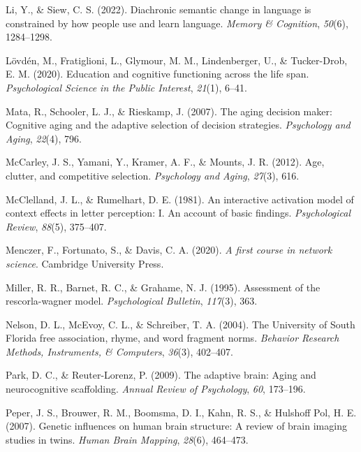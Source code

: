 \documentclass[
  man,floatsintext]{apa6}
\newlength{\cslhangindent}
\newlength{\cslentryspacingunit} %
\newenvironment{CSLReferences}[2] %
 {%
  \setlength{\parindent}{0pt}
  \ifodd #1
  \let\oldpar\par
  \def\par{\hangindent=\cslhangindent\oldpar}
  \fi
  \setlength{\parskip}{#2\cslentryspacingunit}
 }%
 {}
\begin{document}
\begin{CSLReferences}{1}{0}
\leavevmode{}%
Li, Y., \& Siew, C. S. (2022). Diachronic semantic change in language is constrained by how people use and learn language. \emph{Memory \& Cognition}, \emph{50}(6), 1284--1298.

\leavevmode{}%
Lövdén, M., Fratiglioni, L., Glymour, M. M., Lindenberger, U., \& Tucker-Drob, E. M. (2020). Education and cognitive functioning across the life span. \emph{Psychological Science in the Public Interest}, \emph{21}(1), 6--41.

\leavevmode{}%
Mata, R., Schooler, L. J., \& Rieskamp, J. (2007). The aging decision maker: Cognitive aging and the adaptive selection of decision strategies. \emph{Psychology and Aging}, \emph{22}(4), 796.

\leavevmode{}%
McCarley, J. S., Yamani, Y., Kramer, A. F., \& Mounts, J. R. (2012). Age, clutter, and competitive selection. \emph{Psychology and Aging}, \emph{27}(3), 616.

\leavevmode{}%
McClelland, J. L., \& Rumelhart, D. E. (1981). An interactive activation model of context effects in letter perception: I. An account of basic findings. \emph{Psychological Review}, \emph{88}(5), 375--407.

\leavevmode{}%
Menczer, F., Fortunato, S., \& Davis, C. A. (2020). \emph{A first course in network science}. Cambridge University Press.

\leavevmode{}%
Miller, R. R., Barnet, R. C., \& Grahame, N. J. (1995). Assessment of the rescorla-wagner model. \emph{Psychological Bulletin}, \emph{117}(3), 363.

\leavevmode{}%
Nelson, D. L., McEvoy, C. L., \& Schreiber, T. A. (2004). {The University of South Florida free association, rhyme, and word fragment norms}. \emph{Behavior Research Methods, Instruments, \& Computers}, \emph{36}(3), 402--407.

\leavevmode{}%
Park, D. C., \& Reuter-Lorenz, P. (2009). The adaptive brain: Aging and neurocognitive scaffolding. \emph{Annual Review of Psychology}, \emph{60}, 173--196.

\leavevmode{}%
Peper, J. S., Brouwer, R. M., Boomsma, D. I., Kahn, R. S., \& Hulshoff Pol, H. E. (2007). Genetic influences on human brain structure: A review of brain imaging studies in twins. \emph{Human Brain Mapping}, \emph{28}(6), 464--473.


\end{CSLReferences}
\end{document}
